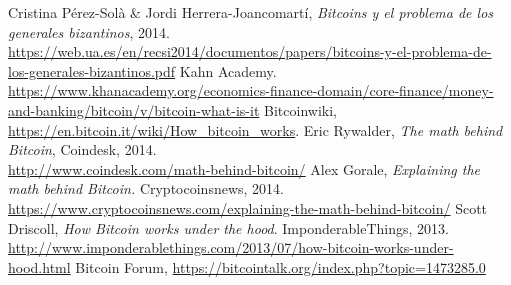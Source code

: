 \documentclass[twoside]{article}
\theoremstyle{definition}
\begin{document}
\begin{thebibliography}{}
 Cristina Pérez-Solà \& Jordi Herrera-Joancomartí, \textit{Bitcoins y el problema de los generales bizantinos}, 2014. \url{https://web.ua.es/en/recsi2014/documentos/papers/bitcoins-y-el-problema-de-los-generales-bizantinos.pdf}
 Kahn Academy. \url{https://www.khanacademy.org/economics-finance-domain/core-finance/money-and-banking/bitcoin/v/bitcoin-what-is-it}
 Bitcoinwiki, \url{https://en.bitcoin.it/wiki/How_bitcoin_works}.
 Eric Rywalder, \textit{The math behind Bitcoin}, Coindesk, 2014.\\ \url{http://www.coindesk.com/math-behind-bitcoin/}
 Alex Gorale, \textit{Explaining the math behind Bitcoin.} Cryptocoinsnews, 2014.\\ \url{https://www.cryptocoinsnews.com/explaining-the-math-behind-bitcoin/}
 Scott Driscoll, \textit{How Bitcoin works under the hood}. ImponderableThings, 2013. \url{http://www.imponderablethings.com/2013/07/how-bitcoin-works-under-hood.html}
 Bitcoin Forum, \url{https://bitcointalk.org/index.php?topic=1473285.0}
\end{thebibliography}
\end{document}
